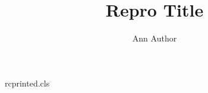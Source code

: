 \begin{filecontents*}[overwrite]{rcprinted.cls}
\newcommand*\keywords[1]{\gdef\@keywords{#1}}
\def\@keywords{}
\newcommand*\pacs[1]{\gdef\@pacs{#1}}
\def\@pacs{}
\def\@maketitle{\begin{center}{\Large\@title\par}\@author\par\end{center}
\noindent Keywords: \@keywords\par
\noindent\@pacs\par}
\end{filecontents*}
\documentclass{rcprinted}
\title{Repro Title}\author{Ann Author}

\maketitle
\begin{center}Department of Repro, University of Witness\end{center}
\begin{abstract}Abstract words here.\end{abstract}
\section{Intro}Body text.

